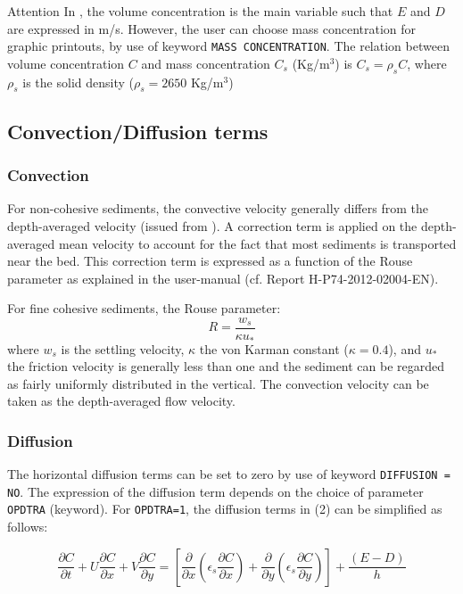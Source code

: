 \begin{bclogo}[couleur = blue!10, arrondi = 0.10, logo = \bcattention]{\textsf{Attention}}
In \sisyphe, the volume concentration is the main variable such that $E$ and $D$
are expressed in m/s. However, the user can choose mass concentration for graphic printouts, by
use of keyword \texttt{MASS CONCENTRATION}.
The relation between volume concentration $C$ and mass concentration $C_s$
(Kg/m$^3$) is $C_s = \rho_s C$, where $\rho_s$ is the solid
density ($\rho_s = 2650$ Kg/m$^3$)
\end{bclogo}

\subsection{Convection/Diffusion terms}
\subsubsection{Convection}
For non-cohesive sediments, the convective velocity generally differs from
the depth-averaged velocity (issued from \teldd). A correction term is
applied on the depth-averaged mean velocity to account for the fact that
most sediments is transported near the bed. This correction term is
expressed as a function of the Rouse parameter as explained in the
user-manual (cf. Report H-P74-2012-02004-EN). 

For fine cohesive sediments, the Rouse parameter:
\begin{equation*}
R=\frac{w_s}{\kappa u_*} 
\end{equation*}%
where $w_s$ is the settling velocity, $\kappa$ the von Karman constant ($\kappa=0.4$), and $u_*$ 
the friction velocity is generally less than
one and the sediment can be regarded as fairly uniformly distributed in the
vertical. The convection velocity can be taken as the depth-averaged flow
velocity.

\subsubsection{Diffusion}
The horizontal diffusion terms can be set to zero by use of keyword
\texttt{DIFFUSION = NO}. The expression of the diffusion term depends on the choice of parameter \texttt{OPDTRA} (keyword).
For \texttt{OPDTRA=1}, the diffusion
terms in (2) can be simplified as follows:

\begin{equation}
\frac{\partial C}{\partial t} + 
U \frac{\partial C}{\partial x} + 
V\frac{\partial C}{\partial y} = 
\left[\frac{\partial}{\partial x} \left(\epsilon_s\frac{\partial C}{\partial x}\right) + 
\frac{\partial}{\partial y}
\left(\epsilon_s \frac{\partial C}{\partial y} \right)\right] + 
\frac{(E-D)}{h} 
\end{equation}

